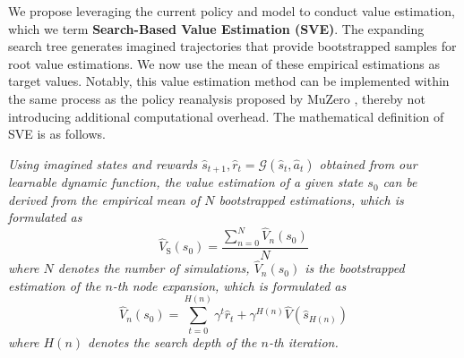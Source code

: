 
We propose leveraging the current policy and model to conduct value estimation, which we term \textbf{Search-Based Value Estimation (SVE)}. The expanding search tree generates imagined trajectories that provide bootstrapped samples for root value estimations. We now use the mean of these empirical estimations as target values. Notably, this value estimation method can be implemented within the same process as the policy reanalysis proposed by MuZero \citep{schrittwieser2021online}, thereby not introducing additional computational overhead.
The mathematical definition of SVE is as follows.
\begin{definition}
\label{def:sve}
\textit{Using imagined states and rewards $\hat{s}_{t+1}, \hat{r}_t=\mathcal{G}(\hat{s}_t,\hat{a}_t)$ obtained from our learnable dynamic function, 
the value estimation of a given state $s_0$ can be derived from the empirical mean of $N$ bootstrapped estimations, which is formulated as
}
\begin{equation}
    \hat{V}_\text{S}(s_0)=\frac{\sum_{n=0}^{N}\hat{V}_n(s_0)}{N}
\end{equation}
\textit{where $N$ denotes the number of simulations, $\hat{V}_n(s_0)$ is the bootstrapped estimation of the $n$-th node expansion, which is formulated as }
\begin{equation}            \hat{V}_n(s_0)=\sum_{t=0}^{H(n)}\gamma^t\hat{r}_t+\gamma^{H(n)}\hat{V}(\hat{s}_{H(n)})
\end{equation}
\textit{where $H(n)$ denotes the search depth of the $n$-th iteration.}
\end{definition}

